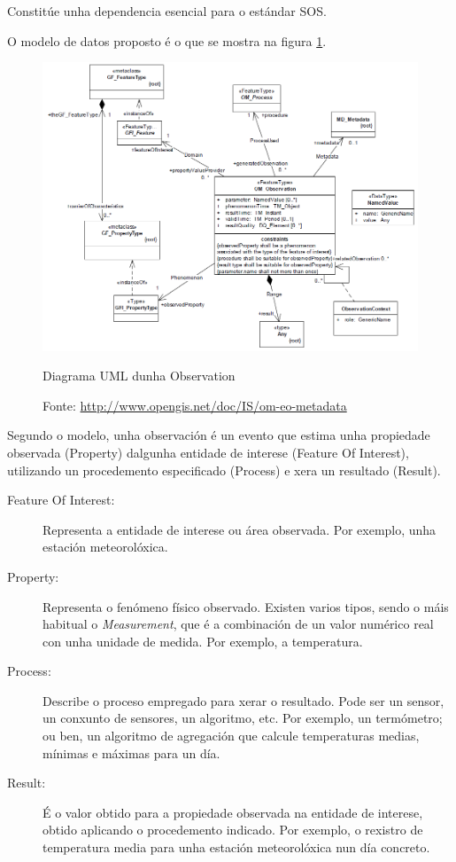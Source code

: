 Constitúe unha dependencia esencial para o estándar SOS.

O modelo de datos proposto é o que se mostra na figura \ref{fig:uml-om}.
\begin{figure}[hbtp]
  \centering
  \includegraphics[width=.85\textwidth]{images/uml-observations.png}
  \caption{Diagrama UML dunha Observation}
  \label{fig:uml-om}
  \caption*{Fonte: \url{http://www.opengis.net/doc/IS/om-eo-metadata}}
\end{figure}

Segundo o modelo, unha observación é un evento que estima unha propiedade observada (Property) dalgunha entidade de interese (Feature Of Interest), utilizando un procedemento especificado (Process) e xera un resultado (Result).

\begin{description}
\item[Feature Of Interest:] Representa a entidade de interese ou área observada. Por exemplo, unha estación meteorolóxica. 
\item[Property:] Representa o fenómeno físico observado. Existen varios tipos, sendo o máis habitual o \emph{Measurement}, que é a combinación de un valor numérico real con unha unidade de medida. Por exemplo, a temperatura.
\item[Process:] Describe o proceso empregado para xerar o resultado. Pode ser un sensor, un conxunto de sensores, un algoritmo, etc. Por exemplo, un termómetro; ou ben, un algoritmo de agregación que calcule temperaturas medias, mínimas e máximas para un día.
\item[Result:] É o valor obtido para a propiedade observada na entidade de interese, obtido aplicando o procedemento indicado. Por exemplo, o rexistro de temperatura media para unha estación meteorolóxica nun día concreto.
\end{description}

